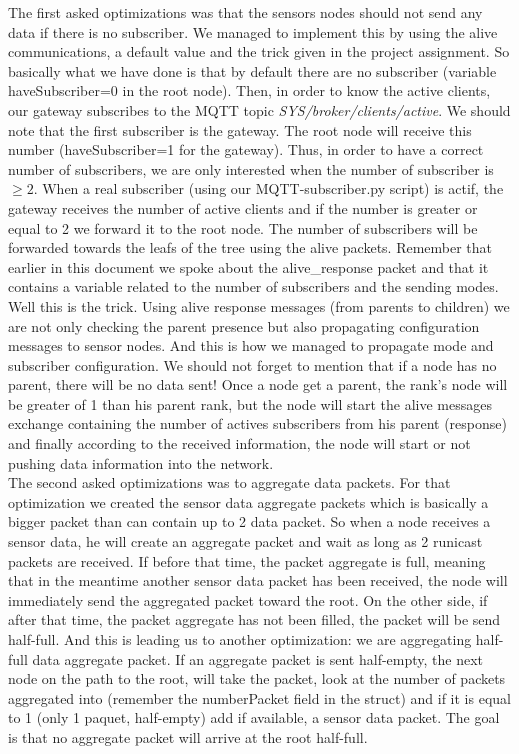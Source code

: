 \documentclass[a4paper,10pt]{article}
\begin{document}
The first asked optimizations was that the sensors nodes should not send any data if there is no subscriber. We managed to implement this by using the alive communications, a default value and the trick given in the project assignment. So basically what we have done is that by default there are no subscriber (variable haveSubscriber=0 in the root node). Then, in order to know the active clients, our gateway subscribes to the MQTT topic \emph{SYS/broker/clients/active}. We should note that the first subscriber is the gateway. The root node will receive this number (haveSubscriber=1 for the gateway). Thus, in order to have a correct number of subscribers, we are only interested when the number of subscriber is $\geq 2$. When a real subscriber (using our MQTT-subscriber.py script) is actif, the gateway receives the number of active clients and if the number is greater or equal to 2 we forward it to the root node. The number of subscribers will be forwarded towards the leafs of the tree using the alive packets. Remember that earlier in this document we spoke about the alive\_response packet and that it contains a variable related to the number of subscribers and the sending modes. Well this is the trick. Using alive response messages (from parents to children) we are not only checking the parent presence but also propagating configuration messages to sensor nodes. And this is how we managed to propagate mode and subscriber configuration. We should not forget to mention that if a node has no parent, there will be no data sent! Once a node get a parent, the rank's node will be greater of 1 than his parent rank, but the node will start the alive messages exchange containing the number of actives subscribers from his parent (response) and finally according to the received information, the node will start or not pushing data information into the network. \\

The second asked optimizations was to aggregate data packets. For that optimization we created the sensor data aggregate packets which is basically a bigger packet than can contain up to 2 data packet. So when a node receives a sensor data, he will create an aggregate packet and wait as long as 2 runicast packets are received. If before that time, the packet aggregate is full, meaning that in the meantime another sensor data packet has been received, the node will immediately send the  aggregated packet toward the root. On the other side, if after that time,  the packet aggregate has not been filled, the packet will be send half-full. And this is leading us to another optimization: we are aggregating half-full data aggregate packet. If an aggregate packet is sent half-empty, the next node on the path to the root, will take the packet, look at the number of packets aggregated into (remember the numberPacket field in the struct) and if it is equal to 1 (only 1 paquet, half-empty) add if available, a sensor data packet. The goal is that no aggregate packet will arrive at the root half-full. \\
\end{document}
